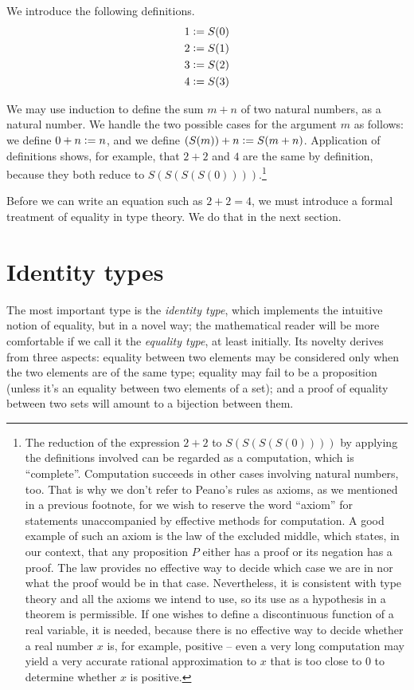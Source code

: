 \documentclass[letter,12pt]{amsart}
\theoremstyle{definition}
\theoremstyle{remark}
\numberwithin{equation}{section}
\newcommand{\defeq}{\vcentcolon=}
\begin{document}
We introduce the following definitions.
\begin{align*}
 1 & \defeq S(0) \\
 2 & \defeq S(1) \\
 3 & \defeq S(2) \\
 4 & \defeq S(3)
\end{align*}

We may use induction to define the sum $m+n$ of two natural numbers, as a natural number.  We handle the two possible cases for the argument $m$
as follows: we define $0+n \defeq n$, and we define $(S(m))+n \defeq S(m+n)$.  Application of definitions shows, for example, that $2+2$ and $4$
are the same by definition, because they both reduce to $S(S(S(S(0))))$.\footnote{The reduction of the expression $2+2$ to $S(S(S(S(0))))$ by
  applying the definitions involved can be regarded as a computation, which is ``complete''.  Computation succeeds in other cases involving
  natural numbers, too.  That is why we don't refer to Peano's rules as axioms, as we mentioned in a previous footnote, for we wish to reserve
  the word ``axiom'' for statements unaccompanied by effective methods for computation.  A good example of such an axiom is the law of the
  excluded middle, which states, in our context, that any proposition $P$ either has a proof or its negation has a proof.  The law provides no
  effective way to decide which case we are in nor what the proof would be in that case.  Nevertheless, it is consistent with type theory and
  all the axioms we intend to use, so its use as a hypothesis in a theorem is permissible.  If one wishes to define a discontinuous function of
  a real variable, it is needed, because there is no effective way to decide whether a real number $x$ is, for example, positive -- even a very
  long computation may yield a very accurate rational approximation to $x$ that is too close to $0$ to determine whether $x$ is positive.}

Before we can write an equation such as $2+2=4$, we must introduce a formal treatment of equality in type theory.  We do that in the next section.

\section{Identity types}\label{paths}

The most important type is the {\em identity type}, which implements the intuitive notion of equality, but in a novel way; the mathematical
reader will be more comfortable if we call it the {\em equality type}, at least initially.  Its novelty derives from three aspects: equality
between two elements may be considered only when the two elements are of the same type; equality may fail to be a proposition (unless it's an
equality between two elements of a set); and a proof of equality between two sets will amount to a bijection between them.
\end{document}
